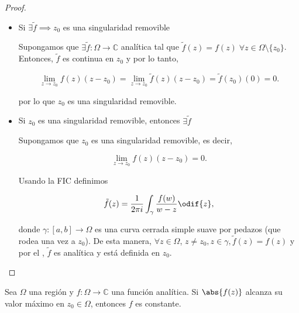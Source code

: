 \documentclass[../main.tex]{subfiles}
\begin{document}
\begin{proof}
    \begin{itemize}
        \item Si \(\exists \tilde{f} \implies z_{0}\) es una singularidad removible

            Supongamos que \(\exists \tilde{f}\colon \Omega \to
            \mathbb{C}\) analítica tal que
            \(\tilde{f}(z) = f(z)\; \forall z\in \Omega\setminus \{z_{0}\}\). Entonces,
            \(\tilde{f}\) es continua en \(z_{0}\) y por lo tanto,

            \begin{equation*}
                \lim_{z \to z_{0}} f(z)(z - z_{0}) = \lim_{z \to z_{0}}
                \tilde{f}(z)(z - z_{0}) =
                \tilde{f}(z_{0})(0) = 0.
            \end{equation*}

            por lo que \(z_{0}\) es una singularidad removible.

        \item Si \(z_{0}\) es una singularidad removible, entonces \(\exists \tilde{f}\)

            Supongamos que \(z_{0}\) es una singularidad removible, es decir,

            \begin{equation*}
                \lim_{z \to z_{0}} f(z)(z - z_{0}) = 0.
            \end{equation*}

            Usando la FIC definimos

            \begin{equation*}
                \tilde{f}(z) = \dfrac{1}{2\pi
                i}\int_{\gamma}^{}\dfrac{f(w)}{w - z}\odif{z},
            \end{equation*}

            donde \(\gamma  \colon [a, b] \to \Omega\) es una curva cerrada
            simple suave por pedazos
            (que rodea una vez a \(z_{0}\)). De esta manera, \(\forall z\in
            \Omega\), \(z \neq
            z_{0}, z\in \gamma, \tilde{f}(z) = f(z)\) y por el
            , \(\tilde{f}\) es
            analítica y está definida en \(z_{0}\).
    \end{itemize}
\end{proof}

\begin{theorem}\label{thm:maximumModulusPrinciple}
    Sea \(\Omega\) una región y \(f \colon \Omega \to \mathbb{C}\) una función
    analítica. Si \(\abs{f(z)}\) alcanza su valor máximo en \(z_{0}\in \Omega\),
    entonces \(f\) es constante.
\end{theorem}
\end{document}
